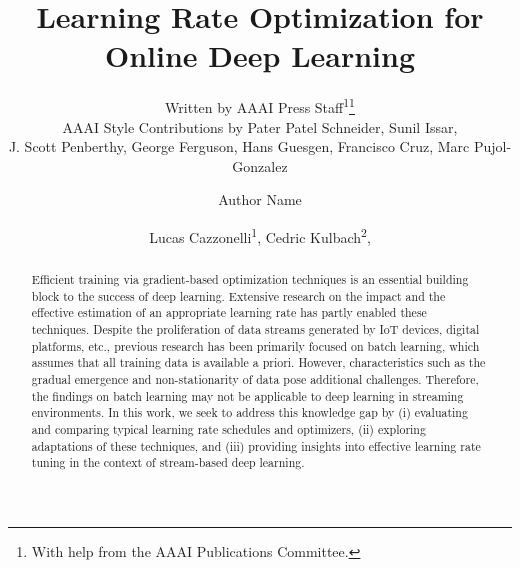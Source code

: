\documentclass[letterpaper]{article} %
\author{
    Written by AAAI Press Staff\textsuperscript{\rm 1}\thanks{With help from the AAAI Publications Committee.}\\
    AAAI Style Contributions by Pater Patel Schneider,
    Sunil Issar,\\
    J. Scott Penberthy,
    George Ferguson,
    Hans Guesgen,
    Francisco Cruz\equalcontrib,
    Marc Pujol-Gonzalez\equalcontrib}
\author{
    Author Name
}
\title{Learning Rate Optimization for Online Deep Learning}
\author{
    Lucas Cazzonelli\textsuperscript{\rm 1},
    Cedric Kulbach\textsuperscript{\rm 2},
}
\begin{document}
\maketitle


\begin{abstract}

	\noindent Efficient training via gradient-based optimization techniques is an essential building block to the success of deep learning. Extensive research on the impact and the effective estimation of an appropriate learning rate has partly enabled these techniques. Despite the proliferation of data streams generated by IoT devices, digital platforms, etc., previous research has been primarily focused on batch learning, which assumes that all training data is available a priori. However, characteristics such as the gradual emergence and non-stationarity of data pose additional challenges. Therefore, the findings on batch learning may not be applicable to deep learning in streaming environments. In this work, we seek to address this knowledge gap by (i) evaluating and comparing typical learning rate schedules and optimizers, (ii) exploring adaptations of these techniques, and (iii) providing insights into effective learning rate tuning in the context of stream-based deep learning.


\end{abstract}
\end{document}
